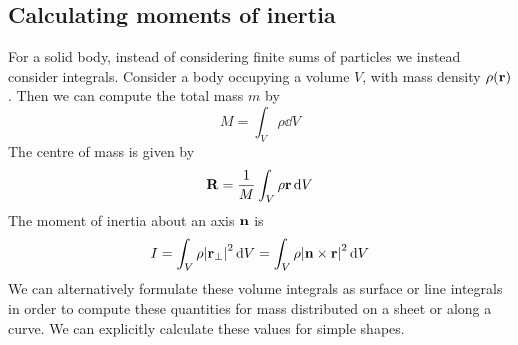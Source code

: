 \subsection{Calculating moments of inertia}
For a solid body, instead of considering finite sums of particles we instead consider integrals.
Consider a body occupying a volume \(V\), with mass density \(\rho(\vb r)\).
Then we can compute the total mass \(m\) by
\[
	M = \int_V \rho \dd{V}
\]
The centre of mass is given by
\[
	\vb R = \frac{1}{M} \int_V \rho \vb r \dd{V}
\]
The moment of inertia about an axis \(\vb n\) is
\[
	I = \int_V \rho \abs{\vb r_\perp}^2 \dd{V} = \int_V \rho \abs{\vb n \times \vb r}^2 \dd{V}
\]
We can alternatively formulate these volume integrals as surface or line integrals in order to compute these quantities for mass distributed on a sheet or along a curve.
We can explicitly calculate these values for simple shapes.
